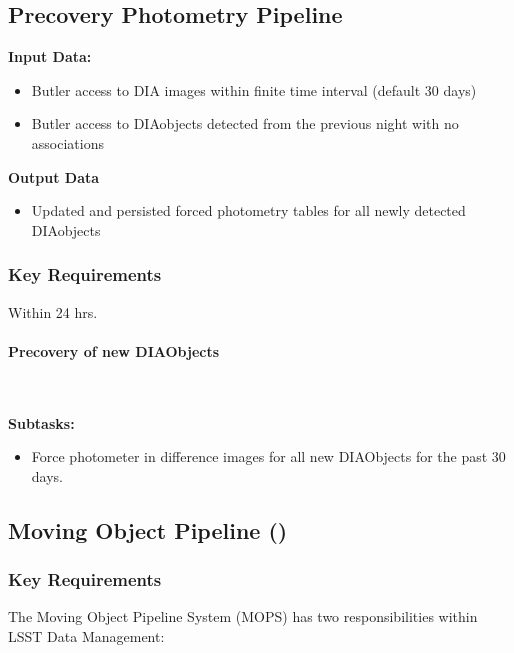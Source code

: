 \clearpage

\subsection{Precovery Photometry Pipeline}

\noindent
{\bf Input Data:}\\
\begin{itemize}
\item Butler access to DIA images within finite time interval (default 
  30 days) 
\item Butler access to DIAobjects detected from the previous night 
  with no associations 
\end{itemize}
{\bf Output Data}\\
\begin{itemize}
\item Updated and persisted forced photometry tables for all newly
  detected DIAobjects
\end{itemize}

\subsubsection{Key Requirements}

Within 24 hrs.

\paragraph{Precovery of new DIAObjects}~

\noindent
{\bf Subtasks:}
\begin{itemize}
\item Force photometer in difference images for all new DIAObjects for the past 30 days.
\end{itemize}
\clearpage

\subsection{Moving Object Pipeline (\wbsMOPS)}

\subsubsection{Key Requirements}

The Moving Object Pipeline System (MOPS) has two responsibilities within LSST Data Management:

